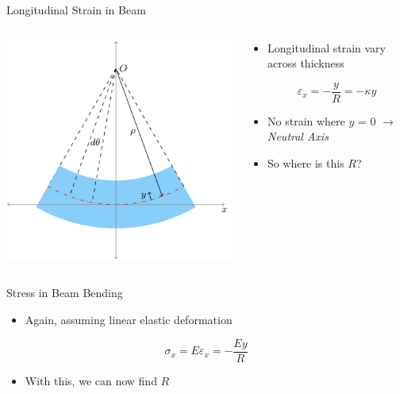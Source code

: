 \documentclass[10pt, svgnames]{beamer}
\begin{document}
\begin{frame}[label={sec:org92212b7}]{Longitudinal Strain in Beam}
\begin{columns}
\begin{column}{0.6\columnwidth}
\begin{center}
\includegraphics[width=.9\linewidth]{pictures/strain-in-beam.pdf}
\end{center}
\end{column}

\begin{column}{0.4\columnwidth}
\begin{itemize}
\item Longitudinal strain vary across thickness

\[\varepsilon_x = - \frac{y}{R} = -\kappa y\]

\item No strain where \(y\) = 0 \(\rightarrow\) \emph{Neutral Axis}

\item So where is this \(R\)?
\end{itemize}
\end{column}
\end{columns}
\end{frame}

\begin{frame}[label={sec:org1dcac39}]{Stress in Beam Bending}
\begin{itemize}
\item Again, assuming linear elastic deformation
\end{itemize}

\[\sigma_x = E \varepsilon_x = - \frac{Ey}{R}\]

\begin{itemize}
\item With this, we can now find \(R\)
\end{itemize}
\end{frame}
\end{document}
